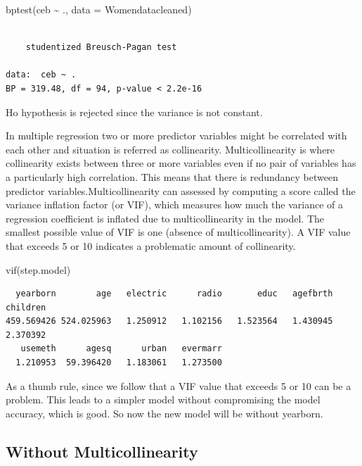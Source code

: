 \documentclass[
  letterpaper,
  DIV=11,
  numbers=noendperiod]{scrartcl}
\newenvironment{Shaded}{\begin{snugshade}}{\end{snugshade}}
\newcommand{\AttributeTok}[1]{\textcolor[rgb]{0.40,0.45,0.13}{#1}}
\newcommand{\FunctionTok}[1]{\textcolor[rgb]{0.28,0.35,0.67}{#1}}
\newcommand{\NormalTok}[1]{\textcolor[rgb]{0.00,0.23,0.31}{#1}}
\newcommand{\SpecialCharTok}[1]{\textcolor[rgb]{0.37,0.37,0.37}{#1}}
\begin{document}
\begin{Shaded}
\begin{Highlighting}[]
\FunctionTok{bptest}\NormalTok{(ceb }\SpecialCharTok{\textasciitilde{}}\NormalTok{ ., }\AttributeTok{data =}\NormalTok{ Womendatacleaned)}
\end{Highlighting}
\end{Shaded}

\begin{verbatim}

    studentized Breusch-Pagan test

data:  ceb ~ .
BP = 319.48, df = 94, p-value < 2.2e-16
\end{verbatim}

Ho hypothesis is rejected since the variance is not constant.

In multiple regression two or more predictor variables might be
correlated with each other and situation is referred as collinearity.
Multicollinearity is where collinearity exists between three or more
variables even if no pair of variables has a particularly high
correlation. This means that there is redundancy between predictor
variables.Multicollinearity can assessed by computing a score called the
variance inflation factor (or VIF), which measures how much the variance
of a regression coefficient is inflated due to multicollinearity in the
model. The smallest possible value of VIF is one (absence of
multicollinearity). A VIF value that exceeds 5 or 10 indicates a
problematic amount of collinearity.

\begin{Shaded}
\begin{Highlighting}[]
\FunctionTok{vif}\NormalTok{(step.model)}
\end{Highlighting}
\end{Shaded}

\begin{verbatim}
  yearborn        age   electric      radio       educ   agefbrth   children 
459.569426 524.025963   1.250912   1.102156   1.523564   1.430945   2.370392 
   usemeth      agesq      urban   evermarr 
  1.210953  59.396420   1.183061   1.273500 
\end{verbatim}

As a thumb rule, since we follow that a VIF value that exceeds 5 or 10
can be a problem. This leads to a simpler model without compromising the
model accuracy, which is good. So now the new model will be without
yearborn.

\hypertarget{without-multicollinearity}{%
\subsection{Without Multicollinearity}\label{without-multicollinearity}}
\end{document}

